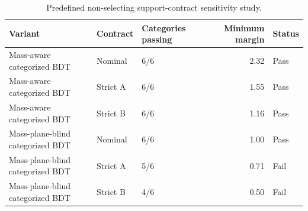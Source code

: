 \begin{table}[tb]
  \centering
  \footnotesize
  \caption{Predefined non-selecting support-contract sensitivity study.}
  \label{tab:c7w-support}
  \begin{tabular}{lllrl}
    \toprule
    Variant & Contract & Categories passing & Minimum margin & Status \\
    \midrule
    Mass-aware categorized BDT & Nominal & 6/6 & 2.32 & Pass \\
    Mass-aware categorized BDT & Strict A & 6/6 & 1.55 & Pass \\
    Mass-aware categorized BDT & Strict B & 6/6 & 1.16 & Pass \\
    Mass-plane-blind categorized BDT & Nominal & 6/6 & 1.00 & Pass \\
    Mass-plane-blind categorized BDT & Strict A & 5/6 & 0.71 & Fail \\
    Mass-plane-blind categorized BDT & Strict B & 4/6 & 0.50 & Fail \\
    \bottomrule
  \end{tabular}
\end{table}
